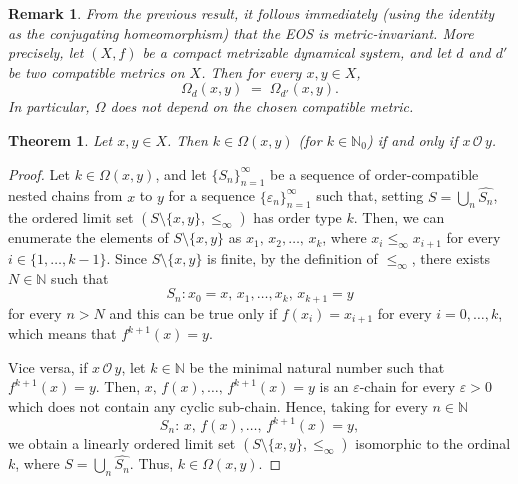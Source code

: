 \documentclass[10pt,a4paper]{article}
\theoremstyle{definition}
\theoremstyle{remark}
\theoremstyle{plain}
\newtheorem{thm}[defi]{Theorem}
\newtheorem{rem}[defi]{Remark}
\begin{document}
\begin{rem}\label{rem:chain-indipendence-metric}
From the previous result, it follows immediately (using the identity as the conjugating homeomorphism) that the EOS is metric-invariant. More precisely, let $(X,f)$ be a compact metrizable dynamical system, and let $d$ and $d'$ be two compatible metrics on $X$. Then for every $x,y\in X$,
$$
\Omega_{d}(x,y)\;=\;\Omega_{d'}(x,y).
$$
In particular, $\Omega$ does not depend on the chosen compatible metric.
\end{rem}




\begin{thm}\label{finite-ordinal}
    Let $x,y\in X$. Then 
    $k\in\Omega(x,y)$ (for $k\in\mathbb{N}_0$) if and only if $x\,\mathcal{O}\,y$.
\end{thm}
\begin{proof}

    Let $k\in\Omega(x,y)$, and let $\{S_n\}_{n=1}^{\infty}$ be a sequence of order-compatible nested chains from $x$ to $y$ for a sequence $\{\varepsilon_n\}_{n=1}^\infty$ such that, setting $S=\bigcup_n\widehat{S_n}$, the ordered limit set $(S\setminus\{x,y\},\le_\infty)$ has order type $k$. Then, we can enumerate the elements of $S\setminus\{x,y\}$ as $x_1,\,x_2,\dots,\,x_k$, where $x_i\le_\infty x_{i+1}$ for every $i\in\{1,\dots,k-1\}$.
    Since $S\setminus\{x,y\}$ is finite, by the definition of $\le_\infty$,  there exists $N\in\mathbb{N}$ such that $$S_n:x_0=x,\,x_1,\dots,x_k,\,x_{k+1}=y $$
    for every $n>N$ and this can be true only if $f(x_i)=x_{i+1}$ for every $i=0,\dots,k$, which means that $f^{k+1}(x)=y$.

    Vice versa, if $x\,\mathcal{O}\,y$, let $k\in\mathbb{N}$ be the minimal natural number such that $f^{k+1}(x)=y$. Then, $x,\,f(x),\dots,\,f^{k+1}(x)=y$ is an $\varepsilon$-chain for every $\varepsilon>0$ which does not contain any cyclic sub-chain. Hence, taking for every $n\in\mathbb N$
    $$S_n:\,x,\,f(x),\dots,\,f^{k+1}(x)=y,$$ we obtain a linearly ordered limit set $(S\setminus\{x,y\},\le_\infty)$ isomorphic to the ordinal $k$, where $S=\bigcup_n\widehat{S_n}$. Thus, $k\in\Omega(x,y)$.
\end{proof}
\end{document}
